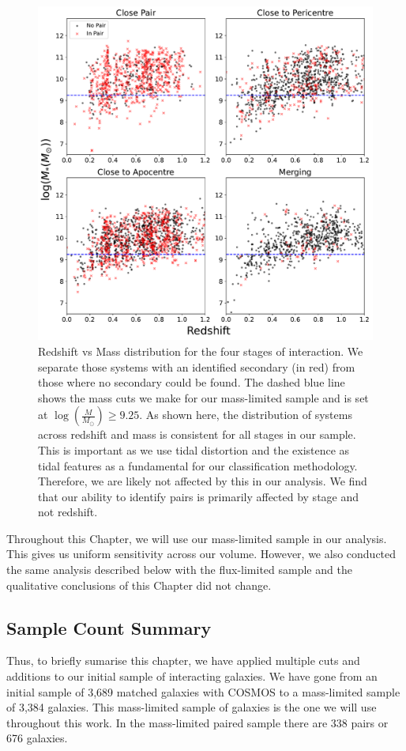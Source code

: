 \begin{figure}
\centering
\includegraphics[width=\textwidth]{Chapter3/figures/redshift-limitations.pdf}
\caption[Redshift vs Mass distribution for each stage of interaction we have defined.]{Redshift vs Mass distribution for the four stages of interaction. We separate those systems with an identified secondary (in red) from those where no secondary could be found. The dashed blue line shows the mass cuts we make for our mass-limited sample and is set at $\log(\frac{M}{M_\odot}) \geq 9.25$. As shown here, the distribution of systems across redshift and mass is consistent for all stages in our sample. This is important as we use tidal distortion and the existence as tidal features as a fundamental for our classification methodology. Therefore, we are likely not affected by this in our analysis. We find that our ability to identify pairs is primarily affected by stage and not redshift.}
\label{fig:redshift_selection}
\end{figure}

Throughout this Chapter, we will use our mass-limited sample in our analysis. This gives us uniform sensitivity across our volume. However, we also conducted the same analysis described below with the flux-limited sample and the qualitative conclusions of this Chapter did not change.

\subsection{Sample Count Summary}\label{sec:sample-summary}
\noindent Thus, to briefly sumarise this chapter, we have applied multiple cuts and additions to our initial sample of interacting galaxies. We have gone from an initial sample of 3,689 matched galaxies with COSMOS to a mass-limited sample of 3,384 galaxies. This mass-limited sample of galaxies is the one we will use throughout this work. In the mass-limited paired sample there are 338 pairs or 676 galaxies.

